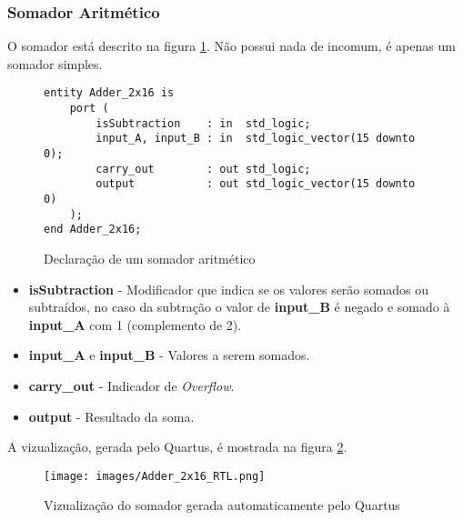 \documentclass{article}
\newcommand\tab[1][0.50cm]{\hspace*{#1}}
\begin{document}
			\subsubsection[Somador]{Somador Aritm\'{e}tico}
				\tab O somador est\'{a} descrito na figura \ref{fig:Adder_2x16}. N\~{a}o possui nada de incomum, \'{e} apenas um somador simples.
				\begin{figure}[H]
					\centering
					\caption[Somador]{Declara\c{c}\~{a}o de um somador aritm\'{e}tico}
					\label{fig:Adder_2x16}
					\begin{lstlisting}[style=vhdl]
entity Adder_2x16 is 
	port (
		isSubtraction	 : in  std_logic;
		input_A, input_B : in  std_logic_vector(15 downto 0);
		carry_out		 : out std_logic;
		output			 : out std_logic_vector(15 downto 0)
	);
end Adder_2x16;
					\end{lstlisting}
				\end{figure}
				\begin{itemize}
					\item \textbf{isSubtraction} - Modificador que indica se os valores ser\~{a}o somados ou subtra\'{i}dos, no caso da subtra\c{c}\~{a}o o valor de \textbf{input\_B} \'{e} negado e somado \`{a} \textbf{input\_A} com 1 (complemento de 2).
					\item \textbf{input\_A} e \textbf{input\_B} - Valores a serem somados.
					\item \textbf{carry\_out} - Indicador de \textit{Overflow}.
					\item \textbf{output} - Resultado da soma.
				\end{itemize}
				\tab A vizualiza\c{c}\~{a}o, gerada pelo Quartus, \'{e} mostrada na figura \ref{fig:Adder_2x16_RTL}.
				\begin{figure}[H]
					\centering
					\caption[Vizualiza\c{c}\~{a}o do somador]{Vizualiza\c{c}\~{a}o do somador gerada automaticamente pelo Quartus}
					\label{fig:Adder_2x16_RTL}
					\texttt{[image: images/Adder\_2x16\_RTL.png]}
				\end{figure}
\end{document}
